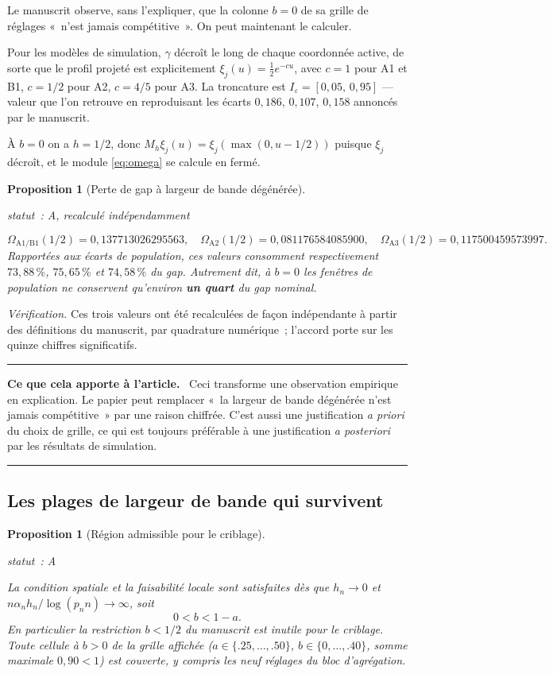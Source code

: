 \documentclass[11pt]{article}
\theoremstyle{plain}
\newtheorem{proposition}[theoreme]{Proposition}
\theoremstyle{definition}
\theoremstyle{remark}
\newcommand{\1}{\mathbf 1}
\newcommand{\I}{I_\varepsilon}
\newcommand{\statut}[1]{%
  \nopagebreak\par\nopagebreak
  \hfill{\normalfont\footnotesize\textcolor{gris}{statut~: #1}}%
  \par\nopagebreak\vspace{-2pt}}
\newenvironment{apport}
  {\par\medskip\noindent\begingroup\color{bleu}\rule{\linewidth}{0.6pt}\par
   \nobreak\vspace{2pt}\noindent\textbf{Ce que cela apporte à l'article.}\ \normalcolor}
  {\par\vspace{2pt}\noindent\textcolor{bleu}{\rule{\linewidth}{0.6pt}}\endgroup\par\medskip}
\begin{document}
Le manuscrit observe, sans l'expliquer, que la colonne $b=0$ de sa grille
de réglages «~n'est jamais compétitive~». On peut maintenant le calculer.

Pour les modèles de simulation, $\gamma$ décroît le long de chaque
coordonnée active, de sorte que le profil projeté est explicitement
$\xi_j(u)=\tfrac12e^{-cu}$, avec $c=1$ pour A1 et B1, $c=1/2$ pour A2,
$c=4/5$ pour A3. La troncature est $\I=[0{,}05,\,0{,}95]$ --- valeur que
l'on retrouve en reproduisant les écarts $0{,}186$, $0{,}107$, $0{,}158$
annoncés par le manuscrit.

À $b=0$ on a $h=1/2$, donc $M_h\xi_j(u)=\xi_j(\max(0,u-1/2))$ puisque
$\xi_j$ décroît, et le module \eqref{eq:omega} se calcule en fermé.

\begin{proposition}[Perte de gap à largeur de bande dégénérée]
\label{prop:b0}
\statut{A, recalculé indépendamment}
\[
 \Omega_{\mathrm{A1/B1}}(1/2)=0{,}137713026295563,\quad
 \Omega_{\mathrm{A2}}(1/2)=0{,}081176584085900,\quad
 \Omega_{\mathrm{A3}}(1/2)=0{,}117500459573997 .
\]
Rapportées aux écarts de population, ces valeurs consomment
respectivement $73{,}88\,\%$, $75{,}65\,\%$ et $74{,}58\,\%$ du gap.
Autrement dit, à $b=0$ les fenêtres de population ne conservent
qu'environ \textbf{un quart} du gap nominal.
\end{proposition}

\noindent
\emph{Vérification.} Ces trois valeurs ont été recalculées de façon
indépendante à partir des définitions du manuscrit, par quadrature
numérique~; l'accord porte sur les quinze chiffres significatifs.

\begin{apport}
Ceci transforme une observation empirique en explication. Le papier peut
remplacer «~la largeur de bande dégénérée n'est jamais compétitive~» par
une raison chiffrée. C'est aussi une justification \emph{a priori} du
choix de grille, ce qui est toujours préférable à une justification
\emph{a posteriori} par les résultats de simulation.
\end{apport}

\subsection{Les plages de largeur de bande qui survivent}

\begin{proposition}[Région admissible pour le criblage]
\label{prop:region-b}
\statut{A}
La condition spatiale et la faisabilité locale sont satisfaites dès que
$h_n\to0$ et $n\alpha_nh_n/\log(p_nn)\to\infty$, soit
\[
 0<b<1-a .
\]
En particulier la restriction $b<1/2$ du manuscrit est \emph{inutile}
pour le criblage. Toute cellule à $b>0$ de la grille affichée
($a\in\{.25,\dots,.50\}$, $b\in\{0,\dots,.40\}$, somme maximale
$0{,}90<1$) est couverte, y compris les neuf réglages du bloc
d'agrégation.
\end{proposition}
\end{document}
